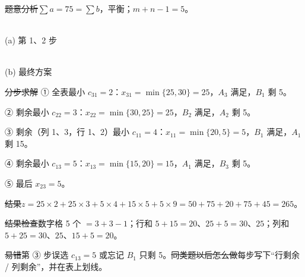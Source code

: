 \st{题意分析}$\sum a=75=\sum b$，平衡；$m+n-1=5$。
\begin{center}
\begin{minipage}{0.48\linewidth}\centering
{}\\{\small (a) 第 1、2 步}
\end{minipage}\hfill
\begin{minipage}{0.48\linewidth}\centering
{}\\{\small (b) 最终方案}
\end{minipage}
\end{center}
\st{分步求解}
① 全表最小 $c_{31}=2$：$x_{31}=\min\{25,30\}=25$，$A_3$ 满足，$B_1$ 剩 5。\par
② 剩余最小 $c_{22}=3$：$x_{22}=\min\{30,25\}=25$，$B_2$ 满足，$A_2$ 剩 5。\par
③ 剩余（列 1、3，行 1、2）最小 $c_{11}=4$：$x_{11}=\min\{20,5\}=5$，$B_1$ 满足，$A_1$ 剩 15。\par
④ 剩余最小 $c_{13}=5$：$x_{13}=\min\{15,20\}=15$，$A_1$ 满足，$B_3$ 剩 5。\par
⑤ 最后 $x_{23}=5$。\par
\st{结果}$z=25\times2+25\times3+5\times4+15\times5+5\times9=50+75+20+75+45=265$。\par
\st{结果检查}数字格 5 个 $=3+3-1$；行和 $5+15=20$、$25+5=30$、$25$；列和 $5+25=30$、$25$、$15+5=20$。\par
\st{易错}第 ③ 步误选 $c_{13}=5$ 或忘记 $B_1$ 只剩 5。\quad\st{同类题以后怎么做}每步写下“行剩余 / 列剩余”，并在表上划线。

